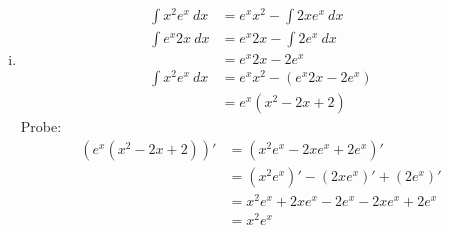 \documentclass[a4paper]{scrartcl}
\begin{document}
\begin{enumerate}
\begin{enumerate}[(i)]
\item
\begin{align}
\int x^2 e^x\ dx
	&=e^x x^2 - \int 2x e^x\ dx\\
\int e^x 2x\ dx
	&=e^x 2x - \int 2e^x\ dx\\
	&=e^x 2x- 2e^x\\
\int x^2 e^x\ dx
	&=e^x x^2 - (e^x 2x- 2e^x) \\
	&=e^x (x^2 -2x+2) 
\end{align}
Probe:
\begin{align}
(e^x(x^2-2x+2))'
	&=(x^2 e^x-2x e^x+2 e^x)'\\
	&=(x^2 e^x)'-(2x e^x)'+(2e^x)'\\
	&=x^2 e^x +2x e^x -2e^x -2x e^x+2e^x\\
	&=x^2 e^x
\end{align}
\end{enumerate}


\end{enumerate}
\end{document}
